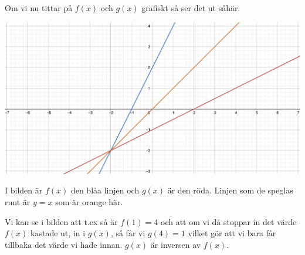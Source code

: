 Om vi nu tittar på $f(x)$ och $g(x)$ grafiskt så ser det ut såhär:

\includegraphics[width=\textwidth]{img/5.png}

I bilden är $f(x)$ den blåa linjen och $g(x)$ är den röda. Linjen som de speglas runt är $y=x$ som är orange här.

Vi kan se i bilden att t.ex så är $f(1)=4$ och att om vi då stoppar in det värde $f(x)$ kastade ut, in i $g(x)$, så får vi $g(4)=1$ vilket gör att vi bara får tillbaka det värde vi hade innan. $g(x)$ är inversen av $f(x)$.






















































